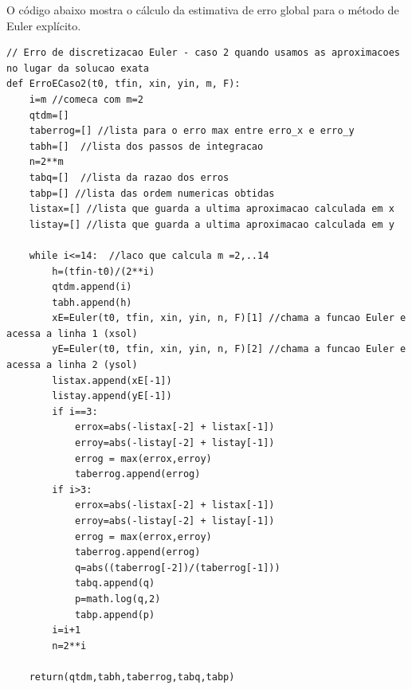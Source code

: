 \documentclass[amsmath,amssymb,floatfix]{revtex4}
\begin{document}
O código abaixo mostra o cálculo da estimativa de erro global para o método de Euler explícito.
\begin{lstlisting}
// Erro de discretizacao Euler - caso 2 quando usamos as aproximacoes no lugar da solucao exata
def ErroECaso2(t0, tfin, xin, yin, m, F):
    i=m //comeca com m=2
    qtdm=[]
    taberrog=[] //lista para o erro max entre erro_x e erro_y
    tabh=[]  //lista dos passos de integracao 
    n=2**m  
    tabq=[]  //lista da razao dos erros
    tabp=[] //lista das ordem numericas obtidas
    listax=[] //lista que guarda a ultima aproximacao calculada em x
    listay=[] //lista que guarda a ultima aproximacao calculada em y
    
    while i<=14:  //laco que calcula m =2,..14 
        h=(tfin-t0)/(2**i)
        qtdm.append(i)
        tabh.append(h)
        xE=Euler(t0, tfin, xin, yin, n, F)[1] //chama a funcao Euler e acessa a linha 1 (xsol)
        yE=Euler(t0, tfin, xin, yin, n, F)[2] //chama a funcao Euler e acessa a linha 2 (ysol)
        listax.append(xE[-1])
        listay.append(yE[-1])
        if i==3:
            errox=abs(-listax[-2] + listax[-1])
            erroy=abs(-listay[-2] + listay[-1])
            errog = max(errox,erroy)
            taberrog.append(errog)
        if i>3:
            errox=abs(-listax[-2] + listax[-1])
            erroy=abs(-listay[-2] + listay[-1])
            errog = max(errox,erroy)
            taberrog.append(errog)           
            q=abs((taberrog[-2])/(taberrog[-1]))
            tabq.append(q)
            p=math.log(q,2)
            tabp.append(p)
        i=i+1
        n=2**i
     
    return(qtdm,tabh,taberrog,tabq,tabp)

\end{lstlisting}
\end{document}
